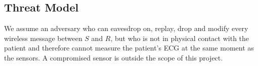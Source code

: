 \subsection{Threat Model}
We assume an adversary who can eavesdrop on, replay, drop and modify every wireless message between $S$ and $R$, but who is not in physical contact with the patient and therefore cannot measure the patient's ECG at the same moment as the sensors. A compromised sensor is outside the scope of this project.
